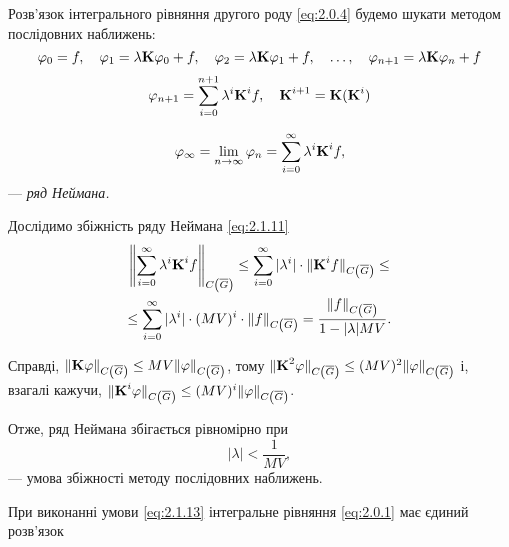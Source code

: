 Розв'язок інтегрального рівняння другого роду \eqref{eq:2.0.4} будемо шукати методом послідовних наближень:
\begin{equation}
	\label{eq:2.1.9}
	\phi_0 = f, \quad \phi_1 = \lambda \bf{K} \phi_0 + f, \quad \phi_2 = \lambda \bf{K} \phi_1 + f, \quad \ldots, \quad \phi_{n + 1} = \lambda \bf{K} \phi_n + f
\end{equation}
\begin{equation}
	\label{eq:2.1.10}
	\phi_{n + 1} = \Sum_{i = 0}^{n + 1} \lambda^i \bf{K}^i f, \quad \bf{K}^{i + 1} = \bf{K} (\bf{K}^i)
\end{equation}

\begin{definition}
	\begin{equation}
		\label{eq:2.1.11}
		\phi_\infty = \Lim_{n \to \infty} \phi_{n} = \Sum_{i = 0}^\infty \lambda^i \bf{K}^i f,
	\end{equation}
	--- \it{ряд Неймана}.
\end{definition}

Дослідимо збіжність ряду Неймана \eqref{eq:2.1.11}
\begin{multline}
	\label{eq:2.1.12}
	\left\| \Sum_{i = 0}^\infty \lambda^i \bf{K}^i f \right\|_{C\left(\overline G\right)} \le \Sum_{i = 0}^\infty |\lambda^i| \cdot \| \bf{K}^i f \|_{C\left(\overline G\right)} \le \\
	\le \Sum_{i = 0}^\infty |\lambda^i| \cdot (MV)^i \cdot \| f \|_{C\left(\overline G\right)} = \dfrac{\|f\|_{C\left(\overline G\right)}}{1 - |\lambda| MV}.
\end{multline}

Справді, $\| \bf{K} \phi\|_{C\left(\overline G\right)} \le MV \|\phi\|_{C\left(\overline G\right)}$, тому $\|\bf{K}^2\phi\|_{C\left(\overline G\right)} \le (MV)^2 \|\phi\|_{C\left(\overline G\right)}$ і, взагалі кажучи, $\|\bf{K}^i\phi\|_{C\left(\overline G\right)} \le (MV)^i \|\phi\|_{C\left(\overline G\right)}$.

\begin{proposition}
	Отже, ряд Неймана збігається рівномірно при 
	\begin{equation}
		\label{eq:2.1.13}
		|\lambda| < \dfrac{1}{MV},
	\end{equation} 
	--- умова збіжності методу послідовних наближень.
\end{proposition}


\begin{lemma}
	При виконанні умови \eqref{eq:2.1.13} інтегральне рівняння \eqref{eq:2.0.1} має єдиний розв'язок
\end{lemma}


